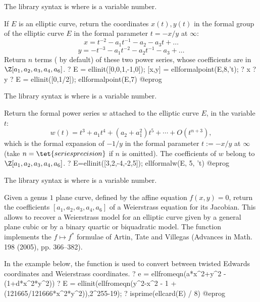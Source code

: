 The library syntax is  where  is a variable number.

\label{se:ellformalpoint}
If $E$ is an elliptic curve, return the coordinates $x(t), y(t)$ in the
formal group of the elliptic curve $E$ in the formal parameter $t = -x/y$
at $\infty$:
$$ x = t^{-2} -a_1 t^{-1} - a_2 - a_3 t + \dots $$
$$ y = - t^{-3} -a_1 t^{-2} - a_2t^{-1} -a_3 + \dots $$
Return $n$ terms ( by default) of these two power
series, whose coefficients are in $\Z[a_1,a_2,a_3,a_4,a_6]$.
\bprog
? E = ellinit([0,0,1,-1,0]); [x,y] = ellformalpoint(E,8,'t);
? x
? y
? E = ellinit([0,1/2]); ellformalpoint(E,7)
@eprog

The library syntax is  where  is a variable number.

\label{se:ellformalw}
Return the formal power series $w$ attached to the elliptic curve $E$,
in the variable $t$:
$$ w(t) = t^3 + a_1 t^4 + (a_2 + a_1^2) t^5 + \cdots + O(t^{n+3}),$$
which is the formal expansion of $-1/y$ in the formal parameter $t := -x/y$
at $\infty$ (take $n = \tet{seriesprecision}$ if $n$ is omitted). The
coefficients of $w$ belong to $\Z[a_1,a_2,a_3,a_4,a_6]$.
\bprog
? E=ellinit([3,2,-4,-2,5]); ellformalw(E, 5, 't)
@eprog

The library syntax is  where  is a variable number.

\label{se:ellfromeqn}
Given a genus $1$ plane curve, defined by the affine equation $f(x,y) = 0$,
return the coefficients $[a_1,a_2,a_3,a_4,a_6]$ of a Weierstrass equation
for its Jacobian. This allows to recover a Weierstrass model for an elliptic
curve given by a general plane cubic or by a binary quartic or biquadratic
model. The function implements the $f \mapsto f^*$ formulae of Artin, Tate
and Villegas (Advances in Math. 198 (2005), pp. 366--382).

In the example below, the function is used to convert between twisted Edwards
coordinates and Weierstrass coordinates.
\bprog
? e = ellfromeqn(a*x^2+y^2 - (1+d*x^2*y^2))
? E = ellinit(ellfromeqn(y^2-x^2 - 1 +(121665/121666*x^2*y^2)),2^255-19);
? isprime(ellcard(E) / 8)
@eprog

